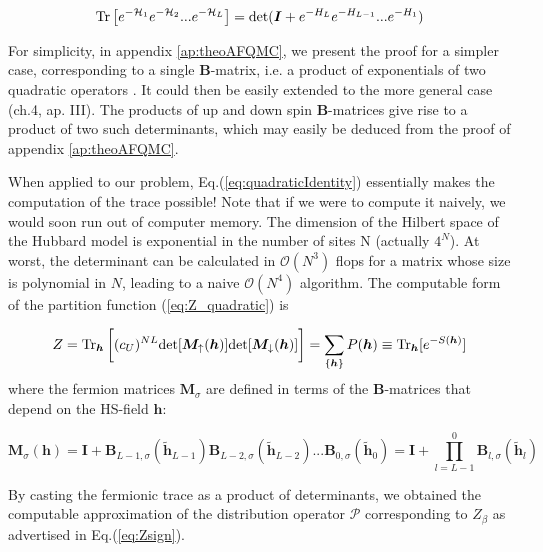 \begin{equation}\label{eq:quadraticIdentity}
\operatorname{Tr} \big[ e^{-\mathcal{H}_1 } e^{-\mathcal{H}_2 } ... e^{-\mathcal{H}_L } \big] = \text{det} ( \bm I + e^{-H_L} e^{-H_{L-1}} ... e^{-H_1} )
\end{equation}

For simplicity, in appendix \ref{ap:theoAFQMC}, we present the proof for a simpler case, corresponding to a single $\bm B$-matrix, i.e. a product of exponentials of two quadratic operators \cite{hirsch_two-dimensional_1985}.
It could then be easily extended to the more general case \cite{hanke_electronic_nodate}(ch.4, ap. III).
The products of up and down spin $\bm B$-matrices give rise to a product of two such determinants, which may easily be deduced from the proof of appendix \ref{ap:theoAFQMC}.

When applied to our problem, Eq.(\ref{eq:quadraticIdentity}) essentially makes the computation of the trace possible! Note that if we were to compute it naively, we would soon run out of computer memory.
The dimension of the Hilbert space of the Hubbard model is exponential in the number of sites N (actually $4^N$).
At worst, the determinant can be calculated in $\mathcal{O}(N^3)$ flops for a matrix whose size is polynomial in $N$, leading to a naive $\mathcal{O}(N^4)$ algorithm.
The computable form of the partition function (\ref{eq:Z_quadratic}) is

\begin{equation}\label{eq:effectiveDensityMatrix}
Z =  \operatorname{Tr}_{\bm h} \bigg[ (c_U)^{NL} \text{det} [ \bm M_\uparrow (\bm h)] \text{det} [  \bm M_\downarrow (\bm h) ] \bigg] = \sum_{\{ \bm h \} } P ( \bm h ) \equiv \operatorname{Tr}_{\bm h} [ e^{-S(\bm h) } ]
\end{equation}
where the fermion matrices $\bm M_\sigma$ are defined in terms of the $\bm B$-matrices that depend on the HS-field $\bm h$:

\begin{equation}
\bm M_\sigma (\bm h) = \bm I + \bm B_{L-1,\sigma} ( \widetilde{\bm h}_{L-1}) \bm B_{L-2,\sigma} ( \widetilde{\bm h}_{L-2}) ... \bm B_{0,\sigma} ( \widetilde{\bm h}_0) = \bm I + \prod_{l= L -1}^0 \bm B_{l,\sigma} ( \widetilde{\bm h}_l )
\end{equation}

By casting the fermionic trace as a product of determinants, we obtained the computable approximation of the distribution operator $\mathcal{P}$ corresponding to $Z_{\beta}$ as advertised in Eq.(\ref{eq:Zsign}).


